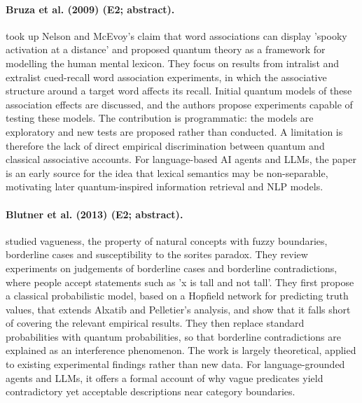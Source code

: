 \documentclass[10pt,a4paper]{article}
\begin{document}
\paragraph{Bruza et al. (2009) (E2; abstract).} \citet{Bruza2009} took up Nelson and McEvoy's claim that word associations can display 'spooky activation at a distance' and proposed quantum theory as a framework for modelling the human mental lexicon. They focus on results from intralist and extralist cued-recall word association experiments, in which the associative structure around a target word affects its recall. Initial quantum models of these association effects are discussed, and the authors propose experiments capable of testing these models. The contribution is programmatic: the models are exploratory and new tests are proposed rather than conducted. A limitation is therefore the lack of direct empirical discrimination between quantum and classical associative accounts. For language-based AI agents and LLMs, the paper is an early source for the idea that lexical semantics may be non-separable, motivating later quantum-inspired information retrieval and NLP models.

\paragraph{Blutner et al. (2013) (E2; abstract).} \citet{Blutner2013} studied vagueness, the property of natural concepts with fuzzy boundaries, borderline cases and susceptibility to the sorites paradox. They review experiments on judgements of borderline cases and borderline contradictions, where people accept statements such as 'x is tall and not tall'. They first propose a classical probabilistic model, based on a Hopfield network for predicting truth values, that extends Alxatib and Pelletier's analysis, and show that it falls short of covering the relevant empirical results. They then replace standard probabilities with quantum probabilities, so that borderline contradictions are explained as an interference phenomenon. The work is largely theoretical, applied to existing experimental findings rather than new data. For language-grounded agents and LLMs, it offers a formal account of why vague predicates yield contradictory yet acceptable descriptions near category boundaries.
\end{document}
